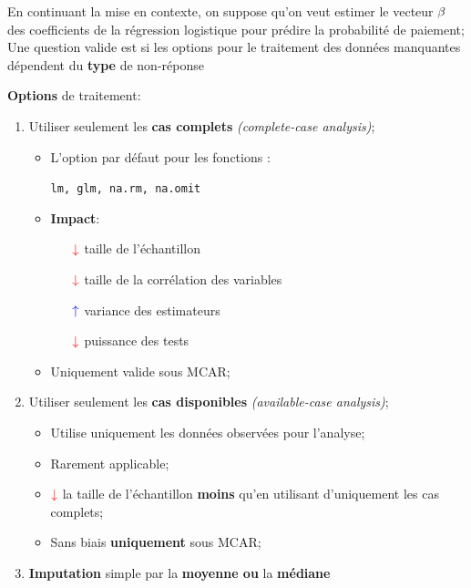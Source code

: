 \documentclass[10pt, french]{article}
\begin{document}
\begin{multicols*}{3}
En continuant la mise en contexte, on suppose qu'on veut estimer le vecteur $\mathbf{\beta}$ des coefficients de la régression logistique pour prédire la probabilité de paiement;
Une question valide est si les options pour le traitement des données manquantes dépendent du \textbf{type} de non-réponse

\textbf{Options} de traitement:
\begin{enumerate}
	\item	Utiliser seulement les \textbf{cas complets} \textit{(complete-case analysis)};
		\begin{itemize}
		\item	L'option par défaut pour les fonctions :
			\begin{center}
			\texttt{lm, glm, na.rm, na.omit}
			\end{center}
		\item	\textbf{Impact}:
			\begin{itemize}
			\item[$\color{red}\downarrow$]	taille de l'échantillon	\\
			\item[$\color{red}\downarrow$]	taille de la corrélation des variables	\\
			\item[$\color{blue}\uparrow$]	variance des estimateurs	\\
			\item[$\color{red}\downarrow$]	puissance des tests	\\
			\end{itemize}
		\item	Uniquement valide sous \textcolor{ao(english)}{MCAR};
		\end{itemize}
	\item	Utiliser seulement les \textbf{cas disponibles} \textit{(available-case analysis)};
		\begin{itemize}
		\item	Utilise uniquement les données observées pour l'analyse;
		\item	Rarement applicable;
		\item	$\color{red}\downarrow$ la taille de l'échantillon \textbf{moins} qu'en utilisant d'uniquement les cas complets;
		\item	\textcolor{ao(english)}{Sans biais} \textbf{uniquement} sous \textcolor{ao(english)}{MCAR};
		\end{itemize}
	\item	\textbf{Imputation} simple par la \textbf{moyenne ou} la \textbf{médiane}

\end{enumerate}
\end{multicols*}
\end{document}
